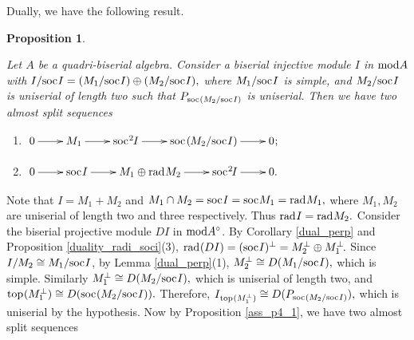 \documentclass[10pt]{amsart}
\newtheorem{Prop}[Theo]{Proposition}
\theoremstyle{definition}
\newcommand{\mmod}{{\rm mod}}
\newcommand{\rad}{{\rm rad}\hspace{.5pt}}
\newcommand{\soc}{{\rm soc}\hspace{.5pt}}
\newcommand{\ntop}{{\rm top}\hspace{.5pt}}
\newcommand{\hp}{\hspace{.5pt}}
\newcommand{\vp}{\vspace{.5pt}}
\begin{document}
\smallskip

Dually, we have the following result. \vspace{-1pt}

\begin{Prop}\label{ass_i4_1} 

Let $A$ be a quadri-biserial algebra. Consider a biserial injective module  $I$ in $\mmod A$ with $I/\soc I = (M_1/\soc I) \oplus (M_2/\soc I),$ where $M_1/\soc I$ is simple, and $M_2/\soc I$ is uniserial of length two such that $P_{\soc(M_2/\soc I)}$ is uniserial. Then we have two almost split sequences

\begin{enumerate}[$(1)$]

\vspace{-2pt} 

\item $\xymatrixcolsep{22pt}\xymatrix{0\ar[r]& M_1 \ar[r] & \soc^2\hspace{-.8pt} I \ar[r] & \soc\hp(\hspace{-.5pt}M_2/\soc I) \ar[r] & 0\hp;}$

\vspace{-2.5pt}

\item $\xymatrixcolsep{22pt}\xymatrix{0\ar[r]& \soc I \ar[r] & M_1 \oplus \rad M_2 \ar[r] & \soc^2\hspace{-1.2pt}I \ar[r] & 0.}$

\end{enumerate}\end{Prop}

\vspace{-.5pt}

 Note that $I=M_1+M_2$ and $M_1\cap M_2=\soc I=\soc M_1=\rad M_1,$ where $M_1, M_2$ are uniserial of length two and three respectively. Thus $\rad I=\rad M_2.$ Consider the biserial projective module $DI$ in $\mmod A^\circ$. By Corollary \ref{dual_perp} and Proposition \ref{duality_radi_soci}(3), $\rad(DI)=(\soc I)^\perp=M_2^\perp \oplus M_1^\perp \hspace{-1pt}.$ Since $I/M_2\cong M_1/\soc I$, by Lemma \ref{dual_perp}(1), $M_2^\perp\cong D(M_1/\soc I),$ which is simple. Similarly $M_1^\perp\cong D(M_2/\soc I),$ which is uniserial of length two, \vp and $\ntop(M_1^\perp) \cong D(\soc(M_2/\soc I)).$ Therefore, $I_{\hp\ntop(M_1^\perp)}\cong D(P_{\soc(M_2/\soc I)}),$ \vp which is uniserial by the hypothesis. \vp Now by Proposition \ref{ass_p4_1}, we have two almost split sequences 
\end{document}

